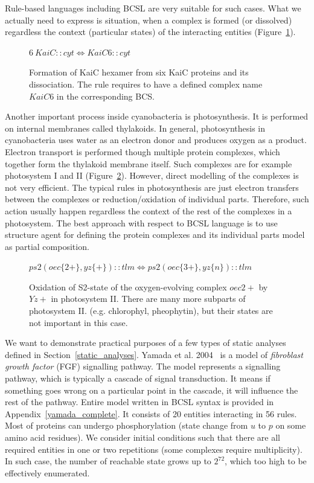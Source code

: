 \documentclass[12pt, twoside]{fithesis2} %
\begin{document}
Rule-based languages including BCSL are very suitable for such cases. What we actually need to express is situation, when a complex is formed (or dissolved) regardless the context (particular states) of the interacting entities (Figure~\ref{hexamer_rule}).

\begin{figure}[!h]
{\small
\begin{center}
$ 6 ~KaiC::cyt \Leftrightarrow KaiC6::cyt $
\end{center}
}
\caption{Formation of KaiC hexamer from six KaiC proteins and its dissociation. The rule requires to have a defined complex name $KaiC6$ in the corresponding BCS.}\label{hexamer_rule}
\end{figure}

Another important process inside cyanobacteria is photosynthesis. It is performed on internal membranes called thylakoids. In general, photosynthesis in cyanobacteria uses water as an electron donor and produces oxygen as a product. Electron transport is performed though multiple protein complexes, which together form the thylakoid membrane itself. Such complexes are for example photosystem I and II (Figure~\ref{ps2_rule}). However, direct modelling of the complexes is not very efficient. The typical rules in photosynthesis are just electron transfers between the complexes or reduction/oxidation of individual parts. Therefore, such action usually happen regardless the context of the rest of the complexes in a photosystem. The best approach with respect to BCSL language is to use structure agent for defining the protein complexes and its individual parts model as partial composition.

\begin{figure}[!h]
{\small
\begin{center}
$ ps2(oec\{2+\}, yz\{+\})::tlm \Leftrightarrow ps2(oec\{3+\}, yz\{n\})::tlm $
\end{center}
}
\caption{Oxidation of S2-state of the oxygen-evolving complex $oec{2+}$ by $Yz{+}$ in photosystem II. There are many more subparts of photosystem II. (e.g. chlorophyl, pheophytin), but their states are not important in this case.}\label{ps2_rule}
\end{figure}

We want to demonstrate practical purposes of a few types of static analyses defined in Section~\ref{static_analyses}. Yamada et al. 2004~\cite{yamada2004model} is a model of \emph{fibroblast growth factor} (FGF) signalling pathway. The model represents a signalling pathway, which is typically a cascade of signal transduction. It means if something goes wrong on a particular point in the cascade, it will influence the rest of the pathway. Entire model written in BCSL syntax is provided in Appendix~\ref{yamada_complete}. It consists of 20 entities interacting in 56 rules. Most of proteins can undergo phosphorylation (state change from $u$ to $p$ on some amino acid residues). We consider initial conditions such that there are all required entities in one or two repetitions (some complexes require multiplicity). In such case, the number of reachable state grows up to $2^{72}$, which too high to be effectively enumerated.
\end{document}
